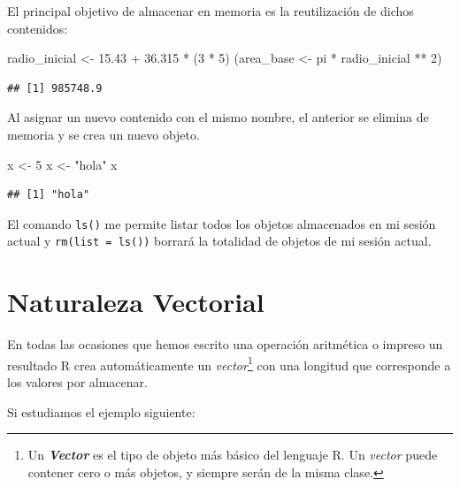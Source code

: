 \documentclass[
]{book}
\newenvironment{Shaded}{\begin{snugshade}}{\end{snugshade}}
\newcommand{\DecValTok}[1]{\textcolor[rgb]{0.00,0.00,0.81}{#1}}
\newcommand{\FloatTok}[1]{\textcolor[rgb]{0.00,0.00,0.81}{#1}}
\newcommand{\NormalTok}[1]{#1}
\newcommand{\OtherTok}[1]{\textcolor[rgb]{0.56,0.35,0.01}{#1}}
\newcommand{\SpecialCharTok}[1]{\textcolor[rgb]{0.00,0.00,0.00}{#1}}
\newcommand{\StringTok}[1]{\textcolor[rgb]{0.31,0.60,0.02}{#1}}
\begin{document}
El principal objetivo de almacenar en memoria es la reutilización de dichos contenidos:

\begin{Shaded}
\begin{Highlighting}[]
\NormalTok{radio\_inicial }\OtherTok{\textless{}{-}} \FloatTok{15.43} \SpecialCharTok{+} \FloatTok{36.315} \SpecialCharTok{*}\NormalTok{ (}\DecValTok{3} \SpecialCharTok{*} \DecValTok{5}\NormalTok{)}
\NormalTok{(area\_base }\OtherTok{\textless{}{-}}\NormalTok{ pi }\SpecialCharTok{*}\NormalTok{ radio\_inicial }\SpecialCharTok{**} \DecValTok{2}\NormalTok{)}
\end{Highlighting}
\end{Shaded}

\begin{verbatim}
## [1] 985748.9
\end{verbatim}

Al asignar un nuevo contenido con el mismo nombre, el anterior se elimina de memoria y se crea un nuevo objeto.

\begin{Shaded}
\begin{Highlighting}[]
\NormalTok{x }\OtherTok{\textless{}{-}} \DecValTok{5}
\NormalTok{x }\OtherTok{\textless{}{-}} \StringTok{"hola"}
\NormalTok{x}
\end{Highlighting}
\end{Shaded}

\begin{verbatim}
## [1] "hola"
\end{verbatim}

El comando \texttt{ls()} me permite listar todos los objetos almacenados en mi sesión actual y \texttt{rm(list\ =\ ls())} borrará la totalidad de objetos de mi sesión actual.

\hypertarget{nat-vec}{%
\section{Naturaleza Vectorial}\label{nat-vec}}

En todas las ocasiones que hemos escrito una operación aritmética o impreso un resultado R crea automáticamente un \emph{vector}\footnote{Un \textbf{\emph{Vector}} es el tipo de objeto más básico del lenguaje R. Un \emph{vector} puede contener cero o más objetos, y siempre serán de la misma clase.} con una longitud que corresponde a los valores por almacenar.

Si estudiamos el ejemplo siguiente:
\end{document}
